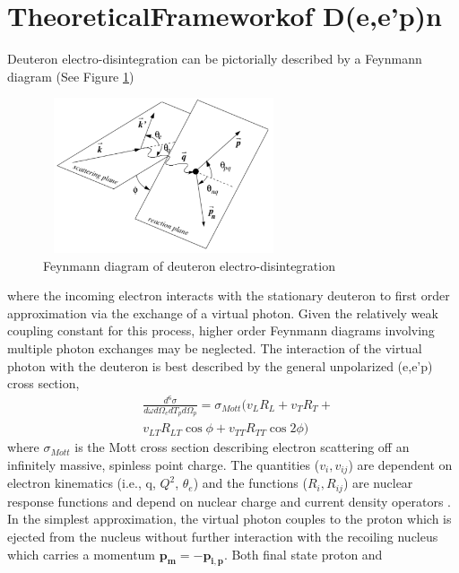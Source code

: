 \documentclass[8pt, twocolumn]{article}
\begin{document}
\section{Theoretical\hspace{1.5mm}Framework\hspace{1.5mm}of D(e,e'p)n}
Deuteron electro-disintegration can be pictorially described by a Feynmann diagram 
(See Figure \ref{fig:Figure1})
\begin{figure}[h]
  \centering
  \includegraphics[width=2.8in, height=1.8in]{feynmann.pdf}
  \caption{Feynmann diagram of deuteron electro-disintegration}
  \label{fig:Figure1}
\end{figure}
\noindent where the incoming electron interacts with the stationary deuteron to first order approximation via the exchange of a virtual
photon. Given the relatively weak coupling constant for this process, higher order Feynmann diagrams involving multiple photon exchanges 
may be neglected. The interaction of the virtual photon with the deuteron is best described by the general unpolarized (e,e'p) cross section,\cite{boeglin2}
\begin{equation} \label{eq:1}
\begin{aligned}
&\frac{d^{6}\sigma}{d\omega d\Omega_{e}dT_{p}d\Omega_{p}} = \sigma_{Mott}(v_{L}R_{L}+v_{T}R_{T}+ \\
&v_{LT}R_{LT}\cos\phi+v_{TT}R_{TT}\cos 2\phi)
\end{aligned}
\end{equation}
where $\sigma_{Mott}$ is the Mott cross section describing electron scattering off an infinitely massive,
spinless point charge. The quantities ($v_{i}, v_{ij}$) are dependent on electron kinematics (i.e., q, $Q^{2}$, $\theta_{e}$) 
and the functions ($R_{i}, R_{ij}$) are nuclear response functions and depend on nuclear charge and
current density operators \cite{hari}. \\
\indent In the simplest approximation, the virtual photon couples to the proton which is ejected
from the nucleus without further interaction with the recoiling nucleus which carries a momentum $\mathbf{p_{m}}=-\mathbf{p_{i,p}}$. Both final state proton and
\end{document}
